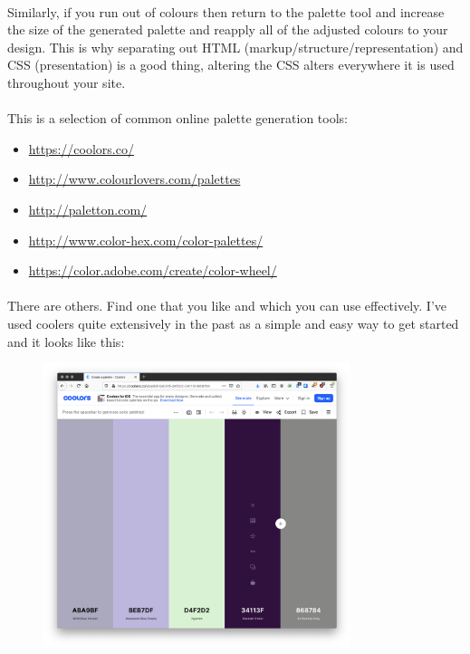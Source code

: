 \paragraph{} Similarly, if you run out of colours then return to the palette tool and increase the size of the generated palette and reapply all of the adjusted colours to your design. This is why separating out HTML (markup/structure/representation) and CSS (presentation) is a good thing, altering the CSS alters everywhere it is used throughout your site.

\paragraph{} This is a selection of common online palette generation tools:

\begin{itemize}
\item \url{https://coolors.co/}
\item \url{http://www.colourlovers.com/palettes}
\item \url{http://paletton.com/}
\item \url{http://www.color-hex.com/color-palettes/}
\item \url{https://color.adobe.com/create/color-wheel/}
\end{itemize}

\paragraph{} There are others. Find one that you like and which you can use effectively. I've used coolers quite extensively in the past as a simple and easy way to get started and it looks like this:

\begin{figure}[H]
    \centering
    \includegraphics[width=0.8\textwidth]{figures/generated-palette-example}
    \label{fig:generated-palette-example}
    \caption{}
\end{figure}


